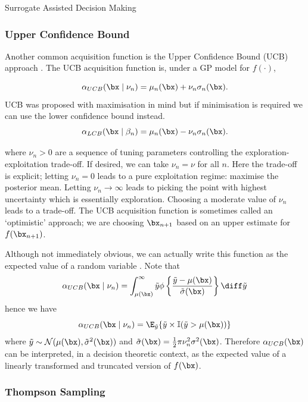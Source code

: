 \begin{chapter}{Surrogate Assisted Decision Making \label{Chap:optimisation}}
\subsubsection{Upper Confidence Bound}

Another common acquisition function is the Upper Confidence Bound (UCB) approach \citep{Srinivas2009}.
The UCB acquisition function is, under a GP model for $f(\cdot)$,

\begin{equation}
  \alpha_{UCB}(\bx \mid \nu_n) = \mu_n(\bx) + \nu_n \sigma_n(\bx).
\end{equation}
UCB was proposed with maximisation in mind but if minimisation is required we can use the lower confidence bound instead.
\begin{equation}
  \alpha_{LCB}(\bx \mid \beta_n) = \mu_n(\bx) - \nu_n \sigma_n(\bx).
\end{equation}

where $\nu_n > 0$ are a sequence of tuning parameters controlling the exploration-exploitation trade-off. If desired, we can take $\nu_n = \nu$ for all $n$. Here the trade-off is explicit; letting $\nu_n = 0$ leads to a pure exploitation regime: maximise the posterior mean. Letting $\nu_n \to \infty$ leads to picking the point with highest uncertainty which is essentially exploration. Choosing a moderate value of $\nu_n$ leads to a trade-off. The UCB acquisition function is sometimes called an `optimistic' approach; we are choosing $\bx_{n+1}$ based on an upper estimate for $f(\bx_{n+1})$.

Although not immediately obvious, we can actually write this function as the expected value of a random variable \citep{JamesWilson2018}. Note that
\begin{equation}
 \alpha_{UCB}(\bx \mid \nu_n) = \int_{\mu(\bx)}^{\infty} \tilde{y} \phi\left\{ \frac{\tilde{y} - \mu(\bx)}{\tilde{\sigma}(\bx)} \right\} \diff \tilde{y}
\end{equation}
hence we have
\begin{equation}
   \alpha_{UCB}(\bx \mid \nu_n) =\E_{\tilde{y}} \{\tilde{y} \times \mathbb{I}(\tilde{y} > \mu(\bx))\}
\end{equation}
where $\tilde{y} \sim \mathcal{N}(\mu(\bx), \tilde{\sigma}^2(\bx))$ and $\tilde{\sigma}(\bx) = \frac{1}{2}\pi \nu_n^2 \sigma^2(\bx)$. Therefore $\alpha_{UCB}(\bx)$ can be interpreted, in a decision theoretic context, as the expected value of a linearly transformed and truncated version of $f(\bx)$.
\subsubsection{Thompson Sampling}


\end{chapter}
